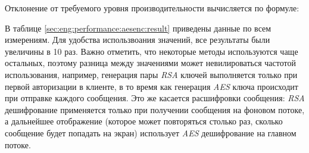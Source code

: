 Отклонение от требуемого уровня производительности вычисляется по формуле:





В таблице \ref{sec:eng:performance:aesenc:result} приведены данные по всем измерениям. Для удобства использвоания значений, все результаты были увеличины в 10 раз. Важно отметить, что некоторые методы используются чаще остальных, поэтому разница между значениями может невилироваться частотой использования, например, генерация пары \textit{RSA} ключей выполняется только при первой авторизации в клиенте, в то время как генерация \textit{AES} ключа происходит при отправке каждого сообщения. Это же касается расшифровки сообщения: \textit{RSA} дешифрование применяется только при получении сообщения на фоновом потоке, а дальнейшее отображение (которое может повторяться столько раз, сколько сообщение будет попадать на экран) использует \textit{AES} дешифрование на главном потоке.

